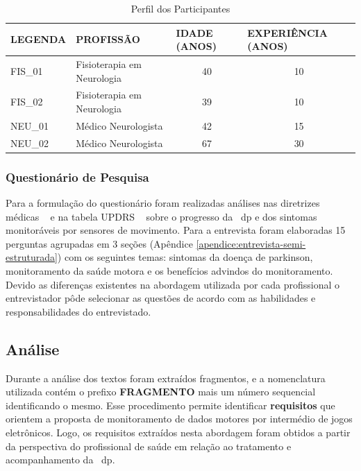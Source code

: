 \begin{table}[h]
\caption{Perfil dos Participantes}
\label{table:perfil_analise_participantes}
\begin{tabular}{|l|l|c|c|}
\hline
\textbf{LEGENDA} & \textbf{PROFISSÃO}             & \multicolumn{1}{|l}{\textbf{IDADE (ANOS)}} & \multicolumn{1}{|l|}{\textbf{EXPERIÊNCIA (ANOS)}} \\ \hline
FIS\_01          & Fisioterapia em Neurologia & 40                                         & 10                                                \\ \hline
FIS\_02          & Fisioterapia em Neurologia     & 39                                         & 10                                                \\ \hline
NEU\_01          & Médico Neurologista            & 42                                         & 15                                                \\ \hline
NEU\_02          & Médico Neurologista            & 67                                         & 30                                                \\ \hline
\end{tabular}

\end{table}

\subsubsection{Questionário de Pesquisa}
Para a formulação do questionário foram realizadas análises nas diretrizes médicas ~\cite{protpar010,national2006parkinson} e na tabela UPDRS ~\cite{updrs87} sobre o progresso da ~\ac{dp} e dos sintomas monitoráveis por sensores de movimento. Para a entrevista foram elaboradas 15 perguntas agrupadas em 3 seções (Apêndice \ref{apendice:entrevista-semi-estruturada}) com os seguintes temas: sintomas da doença de parkinson, monitoramento da saúde motora e os benefícios advindos do monitoramento. Devido as diferenças existentes na abordagem utilizada por cada profissional o entrevistador pôde selecionar as questões de acordo com as habilidades e responsabilidades do entrevistado.

\subsection{Análise}
Durante a análise dos textos foram extraídos fragmentos, e a nomenclatura utilizada contém o prefixo \textbf{FRAGMENTO} mais um número sequencial identificando o mesmo. Esse procedimento permite identificar \textbf{requisitos} que orientem a proposta de monitoramento de dados motores por intermédio de jogos eletrônicos. Logo, os requisitos extraídos nesta abordagem foram obtidos a partir da perspectiva do profissional de saúde em relação ao tratamento e acompanhamento da ~\ac{dp}. 

